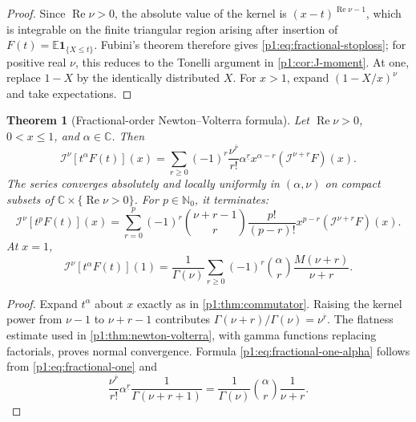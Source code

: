 \documentclass[11pt,oneside]{article}
\newtheorem{theorem}{Theorem}[section]
\theoremstyle{definition}
\theoremstyle{remark}
\newcommand{\E}{\mathbb E}
\newcommand{\C}{\mathbb C}
\newcommand{\N}{\mathbb N}
\newcommand{\fall}[2]{#1^{\underline{#2}}}
\newcommand{\rise}[2]{#1^{\overline{#2}}}
\newcommand{\RL}{\mathcal I}
\newcommand{\1}{\mathbf 1}
\DeclareMathOperator{\Rea}{Re}
\begin{document}
\begin{proof}
Since \(\Rea\nu>0\), the absolute value of the kernel is
\((x-t)^{\Rea\nu-1}\), which is integrable on the finite triangular region
arising after insertion of
\(F(t)=\E\1_{\{X\leq t\}}\).  Fubini's theorem therefore gives
\eqref{p1:eq:fractional-stoploss}; for positive real \(\nu\), this reduces to the
Tonelli argument in \cref{p1:cor:J-moment}.  At one, replace \(1-X\) by the
identically distributed \(X\).  For \(x>1\), expand
\((1-X/x)^\nu\) and take expectations.
\end{proof}

\begin{theorem}[Fractional-order Newton--Volterra formula]\label{p1:thm:fractional-commutator}
Let \(\Rea\nu>0\), \(0<x\leq1\), and \(\alpha\in\C\).  Then
\begin{equation}
 \boxed{\quad
 \RL^\nu[t^\alpha F(t)](x)
 =\sum_{r\geq0}(-1)^r\frac{\rise\nu r}{r!}\fall\alpha r
 x^{\alpha-r}(\RL^{\nu+r}F)(x).
 \quad}                                                        \label{p1:eq:fractional-alpha}
\end{equation}
The series converges absolutely and locally uniformly in \((\alpha,\nu)\) on
compact subsets of \(\C\times\{\Rea\nu>0\}\).  For
\(p\in\N_0\), it terminates:
\begin{equation}
 \RL^\nu[t^pF(t)](x)
 =\sum_{r=0}^p(-1)^r\binom{\nu+r-1}{r}\frac{p!}{(p-r)!}
 x^{p-r}(\RL^{\nu+r}F)(x).                                    \label{p1:eq:fractional-p}
\end{equation}
At \(x=1\),
\begin{equation}
 \boxed{\quad
 \RL^\nu[t^\alpha F(t)](1)
 =\frac1{\Gamma(\nu)}
 \sum_{r\geq0}(-1)^r\binom\alpha r
 \frac{M(\nu+r)}{\nu+r}.
 \quad}                                                        \label{p1:eq:fractional-one-alpha}
\end{equation}
\end{theorem}

\begin{proof}
Expand \(t^\alpha\) about \(x\) exactly as in
\cref{p1:thm:commutator}.  Raising the kernel power from \(\nu-1\) to
\(\nu+r-1\) contributes
\(\Gamma(\nu+r)/\Gamma(\nu)=\rise\nu r\).  The flatness estimate used in
\cref{p1:thm:newton-volterra}, with gamma functions replacing factorials, proves
normal convergence.  Formula \eqref{p1:eq:fractional-one-alpha} follows from
\eqref{p1:eq:fractional-one} and
\[
 \frac{\rise\nu r}{r!}\fall\alpha r
 \frac1{\Gamma(\nu+r+1)}
 =\frac1{\Gamma(\nu)}\binom\alpha r\frac1{\nu+r}.
\]
\end{proof}
\end{document}
